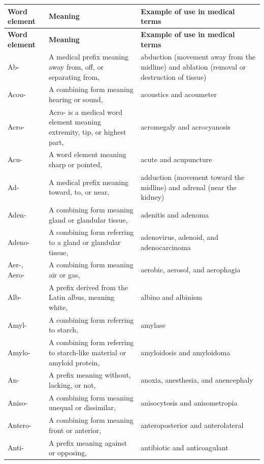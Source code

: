 \small
\setlength{\LTleft}{0pt}
\setlength{\LTright}{0pt}
\begin{longtable}{>{\raggedright\arraybackslash}p{} >{\raggedright\arraybackslash}p{} >{\raggedright\arraybackslash}p{}}
\toprule
\textbf{Word element} & \textbf{Meaning} & \textbf{Example of use in medical terms} \\
\midrule
\endfirsthead
\toprule
\textbf{Word element} & \textbf{Meaning} & \textbf{Example of use in medical terms} \\
\midrule
\endhead
\bottomrule
\endfoot
Ab- & A medical prefix meaning away from, off, or separating from, & abduction (movement away from the midline) and ablation (removal or destruction of tissue) \\
Acou- & A combining form meaning hearing or sound, & acoustics and acoumeter \\
Acro- & Acro- is a medical word element meaning extremity, tip, or highest part, & acromegaly and acrocyanosis \\
Acu- & A word element meaning sharp or pointed, & acute and acupuncture \\
Ad- & A medical prefix meaning toward, to, or near, & adduction (movement toward the midline) and adrenal (near the kidney) \\
Aden- & A combining form meaning gland or glandular tissue, & adenitis and adenoma \\
Adeno- & A combining form referring to a gland or glandular tissue, & adenovirus, adenoid, and adenocarcinoma \\
Aer-, Aero- & A combining form meaning air or gas, & aerobic, aerosol, and aerophagia \\
Alb- & A prefix derived from the Latin albus, meaning white, & albino and albinism \\
Amyl- & A combining form referring to starch, & amylase \\
Amylo- & A combining form referring to starch-like material or amyloid protein, & amyloidosis and amyloidoma \\
An- & A prefix meaning without, lacking, or not, & anoxia, anesthesia, and anencephaly \\
Aniso- & A combining form meaning unequal or dissimilar, & anisocytosis and anisometropia \\
Antero- & A combining form meaning front or anterior, & anteroposterior and anterolateral \\
Anti- & A prefix meaning against or opposing, & antibiotic and anticoagulant \\

\end{longtable}
